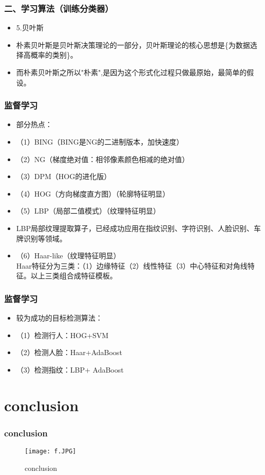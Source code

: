 \documentclass[notheorems,mathserif,table,compress]{beamer}  %
\begin{document}
\begin{frame}
  \frametitle{二、学习算法（训练分类器）}
  \begin{itemize}
  \item 5.贝叶斯
  \item 朴素贝叶斯是贝叶斯决策理论的一部分，贝叶斯理论的核心思想是\{为数据选择高概率的类别\}。
  \item 而朴素贝叶斯之所以"朴素",是因为这个形式化过程只做最原始，最简单的假设。
  \end{itemize}
\end{frame}%

\begin{frame}
  \frametitle{监督学习}  
  \begin{itemize}
  \item 部分热点：
  \item（1）BING（BING是NG的二进制版本，加快速度）
  \item（2）NG（梯度绝对值：相邻像素颜色相减的绝对值）
  \item（3）DPM（HOG的进化版）
  \item（4）HOG（方向梯度直方图）（轮廓特征明显）
  \item（5）LBP（局部二值模式）（纹理特征明显）
  \item LBP局部纹理提取算子，已经成功应用在指纹识别、字符识别、人脸识别、车牌识别等领域。
  \item（6）Haar-like（纹理特征明显）\\
Haar特征分为三类：（1）边缘特征（2）线性特征（3）中心特征和对角线特征。以上三类组合成特征模板。
  \end{itemize}
\end{frame}

\begin{frame}
  \frametitle{监督学习}  
  \begin{itemize}
  \item 较为成功的目标检测算法：
  \item（1）检测行人：HOG+SVM
  \item（2）检测人脸：Haar+AdaBoost
  \item（3）检测指纹：LBP+ AdaBoost
  \end{itemize}
\end{frame}%

\section{conclusion}

\begin{frame}
  \frametitle{conclusion}  
  \begin{figure}[!ht]
  \centering\texttt{[image: f.JPG]}
  \caption{conclusion}
  \end{figure}
\end{frame}%
\end{document}
